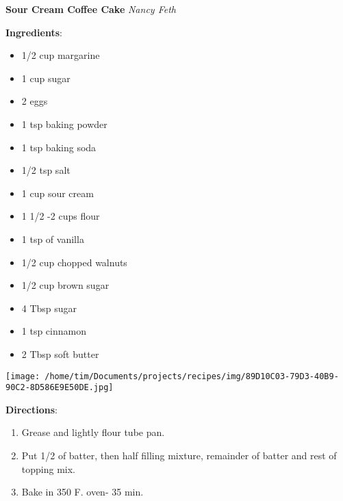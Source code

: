 \documentclass[11pt, twoside, openany]{book}
\begin{document}
\noindent\begin{minipage}[t]{\linewidth}%
{\Large\textbf{Sour Cream Coffee Cake}} \label{sour-cream-coffee-cake}\hfill\textit{Nancy Feth}\\
\noindent\begin{minipage}[t]{0.78\linewidth}%
\textbf{Ingredients}:\vspace{-3mm}
\begin{multicols}{2}
\begin{itemize}\setlength\itemsep{-1mm}
\item 1/2 cup margarine
\item 1 cup sugar
\item 2 eggs
\item 1 tsp baking powder
\item 1 tsp baking soda
\item 1/2 tsp salt
\item 1 cup sour cream
\item 1 1/2 -2 cups flour
\item 1 tsp of vanilla
\item 1/2 cup chopped walnuts
\item 1/2 cup brown sugar
\item 4 Tbsp sugar
\item 1 tsp cinnamon
\item 2 Tbsp soft butter
\end{itemize}
\end{multicols}
\end{minipage}
\noindent\begin{minipage}[t]{0.18\linewidth}
\centering \strut\vspace*{-\baselineskip}\newline
\texttt{[image: /home/tim/Documents/projects/recipes/img/89D10C03-79D3-40B9-90C2-8D586E9E50DE.jpg]}\\
\end{minipage}\vspace{3mm}
\textbf{Directions}:
\vspace{-3mm}\begin{enumerate}\setlength\itemsep{-1mm}
\item Grease and lightly flour tube pan.
\item Put 1/2 of batter, then half filling mixture, remainder of batter and rest of topping mix.
\item Bake in 350 F. oven- 35 min.
\end{enumerate}
\end{minipage}\vspace{8mm}
\end{document}

